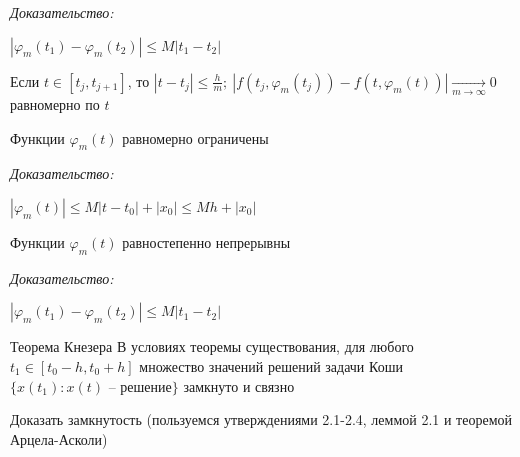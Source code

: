 \documentclass[12pt]{article}
\begin{document}
\textit{Доказательство:}

$|\varphi_m(t_1) - \varphi_m(t_2)| \leq M|t_1 - t_2|$

Если $t \in [t_j, t_{j + 1}]$, то $|t - t_j| \leq \frac{h}{m};\ |f(t_j, \varphi_m(t_j)) - f(t, \varphi_m(t))| \xrightarrow[m \to \infty]{} 0$ равномерно по $t$ 

\begin{propos}{}
    Функции $\varphi_m(t)$ равномерно ограничены 
\end{propos}

\textit{Доказательство:}

$|\varphi_m(t)| \leq M|t - t_0| + |x_0| \leq Mh + |x_0|$

\begin{propos}{}
    Функции $\varphi_m(t)$ равностепенно непрерывны
\end{propos}

\textit{Доказательство:}

$|\varphi_m(t_1) - \varphi_m(t_2)| \leq M|t_1 - t_2|$

\begin{theo}{Теорема Кнезера}
    В условиях теоремы существования, для любого $t_1 \in [t_0 - h, t_0 + h]$ множество значений решений задачи Коши $\{x(t_1) : x(t)\text{ -- решение}\}$ замкнуто и связно
\end{theo}

\begin{Exercise}{}
    Доказать замкнутость (пользуемся утверждениями 2.1-2.4, леммой 2.1 и теоремой Арцела-Асколи)
\end{Exercise}
\end{document}
